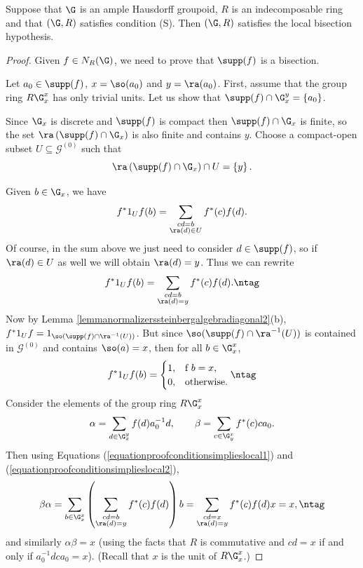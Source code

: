 \begin{proposition}\label{propositionconditionsimplieslocalbisectionhypothesis}
Suppose that $\G$ is an ample Hausdorff groupoid, $R$ is an indecomposable ring and that $(\G,R)$ satisfies condition (S). Then $(\G,R)$ satisfies the local bisection hypothesis.%
\end{proposition}
\begin{proof}
Given $f\in N_R(\G)$, we need to prove that $\supp(f)$ is a bisection.

Let $a_0\in\supp(f)$, $x=\so(a_0)$ and $y=\ra(a_0)$. First, assume that the group ring $R\G_x^x$ has only trivial units. Let us show that $\supp(f)\cap\G_x^y=\left\{a_0\right\}$.

Since $\G_x$ is discrete and $\supp(f)$ is compact then $\supp(f)\cap\G_x$ is finite, so the set $\ra\left(\supp(f)\cap\G_x\right)$ is also finite and contains $y$. Choose a compact-open subset $U\subseteq\mathcal{G}^{(0)}$ such that
\[\ra\left(\supp(f)\cap\G_x\right)\cap U=\left\{y\right\}.\]

Given $b\in\G_x$, we have
\[f^*1_Uf(b)=\sum_{\substack{cd=b\\\ra(d)\in U}}f^*(c)f(d).\]
Of course, in the sum above we just need to consider $d\in\supp(f)$, so if $\ra(d)\in U$ as well we will obtain $\ra(d)=y$. Thus we can rewrite
\[f^*1_Uf(b)=\sum_{\substack{cd=b\\\ra(d)=y}}f^*(c)f(d).\ntag\label{equationproofconditionsimplieslocal1}\]
Now by Lemma \ref{lemmanormalizerssteinbergalgebradiagonal2}(b), $f^*1_Uf=1_{\so(\supp(f)\cap \ra^{-1}(U))}$. But since $\so(\supp(f)\cap \ra^{-1}(U))$ is contained in $\mathcal{G}^{(0)}$ and contains $\so(a)=x$, then for all $b\in \G_x^x$,
\[f^*1_Uf(b)=\begin{cases}
1,&\text{f }b=x,\\
0,&\text{otherwise.}
\end{cases}\ntag\label{equationproofconditionsimplieslocal2}\]
Consider the elements of the group ring $R\G_x^x$
\[\alpha=\sum_{d\in\G_x^y}f(d)a_0^{-1}d,\qquad\beta=\sum_{c\in\G_y^x}f^*(c)ca_0.\]
Then using Equations (\ref{equationproofconditionsimplieslocal1}) and (\ref{equationproofconditionsimplieslocal2}),
\[\beta\alpha=\sum_{b\in\G_x^x}\left(\sum_{\substack{cd=b\\\ra(d)=y}}f^*(c)f(d)\right)b=\sum_{\substack{cd=x\\\ra(d)=y}}f^*(c)f(d)x=x,\ntag\label{equationproofconditionsimplieslocal}\]
and similarly $\alpha\beta=x$ (using the facts that $R$ is commutative and $cd=x$ if and only if $a_0^{-1}dca_0=x$). (Recall that $x$ is the unit of $R\G_x^x$.)


\end{proof}

